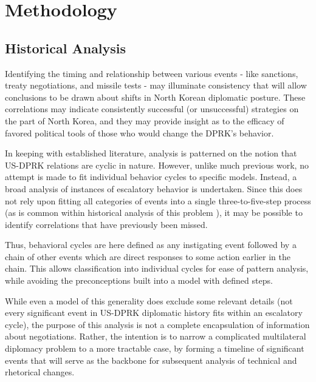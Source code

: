\documentclass{article}
\begin{document}

\section{Methodology}


\subsection{Historical Analysis}

Identifying the timing and relationship between various events - like sanctions, treaty negotiations, and missile tests - may illuminate consistency that will allow conclusions to be drawn about shifts in North Korean diplomatic posture. These correlations may indicate consistently successful (or unsuccessful) strategies on the part of North Korea, and they may provide insight as to the efficacy of favored political tools of those who would change the DPRK's behavior.

In keeping with established literature, analysis is patterned on the notion that US-DPRK relations are cyclic in nature. However, unlike much previous work, no attempt is made to fit individual behavior cycles to specific models. Instead, a broad analysis of instances of escalatory behavior is undertaken. Since this does not rely upon fitting all categories of events into a single three-to-five-step process (as is common within historical analysis of this problem \cite{fisher, jun}), it may be possible to identify correlations that have previously been missed.

Thus, behavioral cycles are here defined as any instigating event followed by a chain of other events which are direct responses to some action earlier in the chain. This allows classification into individual cycles for ease of pattern analysis, while avoiding the preconceptions built into a model with defined steps.

While even a model of this generality does exclude some relevant details (not every significant event in US-DPRK diplomatic history fits within an escalatory cycle), the purpose of this analysis is not a complete encapsulation of information about negotiations. Rather, the intention is to narrow a complicated multilateral diplomacy problem to a more tractable case, by forming a timeline of significant events that will serve as the backbone for subsequent analysis of technical and rhetorical changes.
\end{document}
